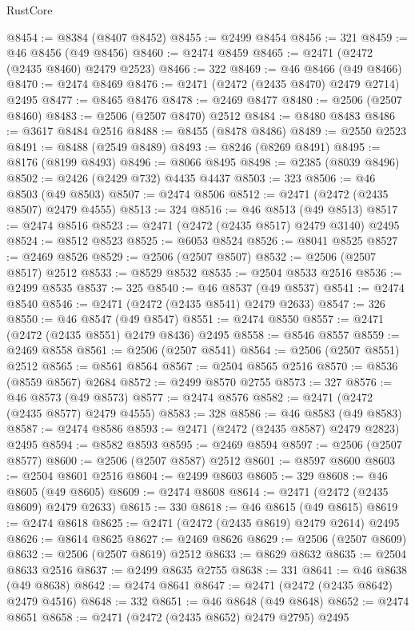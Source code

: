 \begin{lexlean}{RustCore}
\begin{coremodule}
@8454 := @8384 (@8407 @8452)
@8455 := @2499 @8454
@8456 := 321
@8459 := @46 @8456 (@49 @8456)
@8460 := @2474 @8459
@8465 := @2471 (@2472 (@2435 @8460) @2479 @2523)
@8466 := 322
@8469 := @46 @8466 (@49 @8466)
@8470 := @2474 @8469
@8476 := @2471 (@2472 (@2435 @8470) @2479 @2714) @2495
@8477 := @8465 @8476
@8478 := @2469 @8477
@8480 := @2506 (@2507 @8460)
@8483 := @2506 (@2507 @8470) @2512
@8484 := @8480 @8483
@8486 := @3617 @8484 @2516
@8488 := @8455 (@8478 @8486)
@8489 := @2550 @2523
@8491 := @8488 (@2549 @8489)
@8493 := @8246 (@8269 @8491)
@8495 := @8176 (@8199 @8493)
@8496 := @8066 @8495
@8498 := @2385 (@8039 @8496)
@8502 := @2426 (@2429 @732) @4435 @4437
@8503 := 323
@8506 := @46 @8503 (@49 @8503)
@8507 := @2474 @8506
@8512 := @2471 (@2472 (@2435 @8507) @2479 @4555)
@8513 := 324
@8516 := @46 @8513 (@49 @8513)
@8517 := @2474 @8516
@8523 := @2471 (@2472 (@2435 @8517) @2479 @3140) @2495
@8524 := @8512 @8523
@8525 := @6053 @8524
@8526 := @8041 @8525
@8527 := @2469 @8526
@8529 := @2506 (@2507 @8507)
@8532 := @2506 (@2507 @8517) @2512
@8533 := @8529 @8532
@8535 := @2504 @8533 @2516
@8536 := @2499 @8535
@8537 := 325
@8540 := @46 @8537 (@49 @8537)
@8541 := @2474 @8540
@8546 := @2471 (@2472 (@2435 @8541) @2479 @2633)
@8547 := 326
@8550 := @46 @8547 (@49 @8547)
@8551 := @2474 @8550
@8557 := @2471 (@2472 (@2435 @8551) @2479 @8436) @2495
@8558 := @8546 @8557
@8559 := @2469 @8558
@8561 := @2506 (@2507 @8541)
@8564 := @2506 (@2507 @8551) @2512
@8565 := @8561 @8564
@8567 := @2504 @8565 @2516
@8570 := @8536 (@8559 @8567) @2684
@8572 := @2499 @8570 @2755
@8573 := 327
@8576 := @46 @8573 (@49 @8573)
@8577 := @2474 @8576
@8582 := @2471 (@2472 (@2435 @8577) @2479 @4555)
@8583 := 328
@8586 := @46 @8583 (@49 @8583)
@8587 := @2474 @8586
@8593 := @2471 (@2472 (@2435 @8587) @2479 @2823) @2495
@8594 := @8582 @8593
@8595 := @2469 @8594
@8597 := @2506 (@2507 @8577)
@8600 := @2506 (@2507 @8587) @2512
@8601 := @8597 @8600
@8603 := @2504 @8601 @2516
@8604 := @2499 @8603
@8605 := 329
@8608 := @46 @8605 (@49 @8605)
@8609 := @2474 @8608
@8614 := @2471 (@2472 (@2435 @8609) @2479 @2633)
@8615 := 330
@8618 := @46 @8615 (@49 @8615)
@8619 := @2474 @8618
@8625 := @2471 (@2472 (@2435 @8619) @2479 @2614) @2495
@8626 := @8614 @8625
@8627 := @2469 @8626
@8629 := @2506 (@2507 @8609)
@8632 := @2506 (@2507 @8619) @2512
@8633 := @8629 @8632
@8635 := @2504 @8633 @2516
@8637 := @2499 @8635 @2755
@8638 := 331
@8641 := @46 @8638 (@49 @8638)
@8642 := @2474 @8641
@8647 := @2471 (@2472 (@2435 @8642) @2479 @4516)
@8648 := 332
@8651 := @46 @8648 (@49 @8648)
@8652 := @2474 @8651
@8658 := @2471 (@2472 (@2435 @8652) @2479 @2795) @2495

\end{coremodule}
\end{lexlean}
